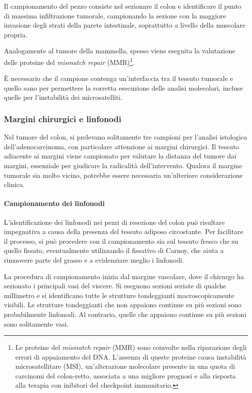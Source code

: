 Il campionamento del pezzo consiste nel sezionare il colon e identificare il punto di massima infiltrazione tumorale, campionando la sezione con la maggiore invasione degli strati della parete intestinale, soprattutto a livello della muscolare propria.

Analogamente al tumore della mammella, spesso viene eseguita la valutazione delle proteine del \textit{mismatch repair} (MMR)\footnote{Le proteine del \textit{mismatch repair} (MMR) sono coinvolte nella riparazione degli errori di appaiamento del DNA. L'assenza di queste proteine causa instabilità microsatellitare (MSI), un'alterazione molecolare presente in una quota di carcinomi del colon-retto, associata a una migliore prognosi e alla risposta alla terapia con inibitori del checkpoint immunitario.}. 

È necessario che il campione contenga un'interfaccia tra il tessuto tumorale e quello sano per permettere la corretta esecuzione delle analisi molecolari, incluse quelle per l'instabilità dei microsatelliti.

\subsubsection{Margini chirurgici e linfonodi}
Nel tumore del colon, si prelevano solitamente tre campioni per l'analisi istologica dell'adenocarcinoma, con particolare attenzione ai margini chirurgici. Il tessuto adiacente ai margini viene campionato per valutare la distanza del tumore dai margini, essenziale per giudicare la radicalità dell'intervento. Qualora il margine tumorale sia molto vicino, potrebbe essere necessaria un'ulteriore considerazione clinica.

\paragraph{Campionamento dei linfonodi}
L'identificazione dei linfonodi nei pezzi di resezione del colon può risultare impegnativa a causa della presenza del tessuto adiposo circostante. Per facilitare il processo, si può procedere con il campionamento sia sul tessuto fresco che su quello fissato, eventualmente utilizzando il fissativo di Carnoy, che aiuta a rimuovere parte del grasso e a evidenziare meglio i linfonodi.

La procedura di campionamento inizia dal margine vascolare, dove il chirurgo ha sezionato i principali vasi del viscere. Si eseguono sezioni seriate di qualche millimetro e si identificano tutte le strutture tondeggianti macroscopicamente visibili. Le strutture tondeggianti che non appaiono continue su più sezioni sono probabilmente linfonodi. Al contrario, quelle che appaiono continue su più sezioni sono solitamente vasi.

